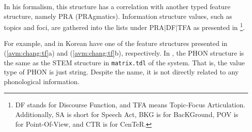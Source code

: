 \noindent In his formalism, this structure has a correlation with
another typed feature structure, namely PRA (PRAgmatics). Information
structure values, such as topics and foci, are gathered into the lists
under PRA{$\mid$}DF{$\mid$}TFA as presented in
\footnote{DF stands for Discourse Function, and
  TFA means Topic-Focus Articulation. Additionally, SA is short for
  Speech Act, BKG is for BacKGround, POV is for Point-Of-View, and CTR
  is for CenTeR.}.


\noindent For example, \nun and \ika in Korean have one of the feature
structures presented in (\ref{avm:chang:tf}a) and
(\ref{avm:chang:tf}b), respectively.  In , the
PHON structure is the same as the STEM structure in
\texttt{matrix.tdl} of the \lingo {} system. That is, the
value type of PHON is just string. Despite the name, it is not
directly related to any 
phonological information.


